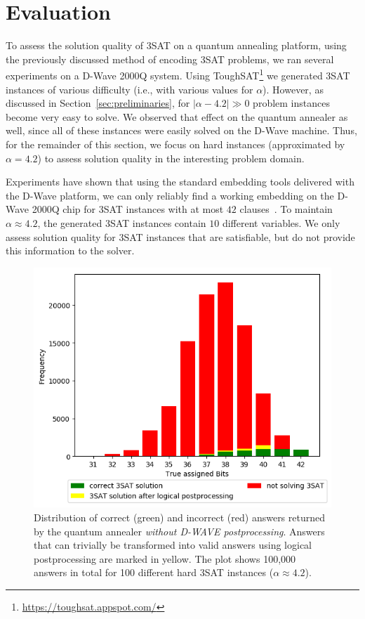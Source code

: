 
\section{Evaluation}
\label{sec:evaluation}

To assess the solution quality of 3SAT on a quantum annealing platform, using the previously discussed method of encoding 3SAT problems, we ran several experiments on a D-Wave 2000Q system. Using ToughSAT\footnote{\url{https://toughsat.appspot.com/}} we generated 3SAT instances of various difficulty (i.e., with various values for $\alpha$). However, as discussed in Section~\ref{sec:preliminaries}, for $|\alpha - 4.2| \gg 0$ problem instances become very easy to solve. We observed that effect on the quantum annealer as well, since all of these instances were easily solved on the D-Wave machine. Thus, for the remainder of this section, we focus on hard instances (approximated by $\alpha = 4.2$) to assess solution quality in the interesting problem domain.

Experiments have shown that using the standard embedding tools delivered with the D-Wave platform, we can only reliably find a working embedding on the D-Wave 2000Q chip for 3SAT instances with at most $42$ clauses~\cite{adams1995hitchhikers}. To maintain $\alpha \approx 4.2$, the generated 3SAT instances contain $10$ different variables. We only assess solution quality for 3SAT instances that are satisfiable, but do not
provide this information to the solver.

\begin{figure}[t]
\centering
\includegraphics[width=.7\textwidth]{../material_2/Plots/42_4_2_def_engl_color_mit_transform.png}
\caption{Distribution of correct (green) and incorrect (red) answers returned by the quantum annealer \emph{without D-WAVE postprocessing}. Answers that can trivially be transformed into valid answers using logical postprocessing are marked in yellow. The plot shows 100,000 answers in total for 100 different hard 3SAT instances ($\alpha \approx 4.2$).}
\label{fig:distr-no-pp}
\end{figure}

